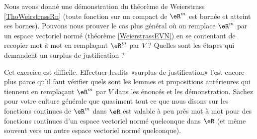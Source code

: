 \begin{exercice}\label{exoGeomAnal-0013}

	Nous avons donné une démonstration du théorème de Weierstrass \ref{ThoWeirstrassRn} (toute fonction sur un compact de $\eR^m$ est bornée et atteint ses bornes). Pouvons nous prouver le cas plus général où on remplace $\eR^m$ par un espace vectoriel normé (théorème \ref{WeierstrassEVN}) en se contentant de recopier mot à mot en remplaçant $\eR^m$ par $V$ ? Quelles sont les étapes qui demandent un surplus de justification ?

	Cet exercice est difficile. Effectuer lesdits «surplus de justification» l'est encore plus parce qu'il faut vérifier quels sont les lemmes et propositions antérieures qui tiennent en remplaçant $\eR^m$ par $V$ dans les énoncés et les démonstration. Sachez pour votre culture générale que quasiment tout ce que nous disons sur les fonctions continues de $\eR^m$ dans $\eR$ est valable à peu près mot à mot pour des fonctions continues d'un espace vectoriel normé quelconque dans $\eR$ (et même souvent vers un autre espace vectoriel normé quelconque).

\end{exercice}
